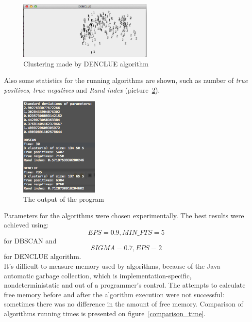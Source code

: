 \documentclass[12pt, a4paper, notitlepage, oneside]{article}
\begin{document}
\begin{figure}[!ht]
 	\centering
	\includegraphics[width=0.6\textwidth]{images/denclue.png}
 	\caption[]
	{Clustering made by DENCLUE algorithm}
		\label{denclue}
	\end{figure}

Also some statistics for the running algorithms are shown, such as number of \textit{true positives}, \textit{true negatives} and \textit{Rand index} (picture~\ref{result}).

\begin{figure}[!ht]
 	\centering
	\includegraphics[width=0.35\textwidth]{images/results.png}
 	\caption[]
	{The output of the program}
		\label{result}
\end{figure}

Parameters for the algorithms were chosen experimentally. The best results were achieved using: 
$$EPS = 0.9, MIN\_PTS = 5$$
for DBSCAN and
$$SIGMA = 0.7, EPS = 2$$
for DENCLUE algorithm. \\

It's difficult to measure memory used by algorithms, because of the Java automatic garbage collection, 
which is implementation-specific, nondeterministatic and out of a programmer's control. 
The attempts to calculate free memory before and after the algorithm execution 
were not successful: sometimes there was no difference in the amount of free memory.
Comparison of algorithms running times is presented on figure~\ref{comparison_time}. \\
\end{document}
